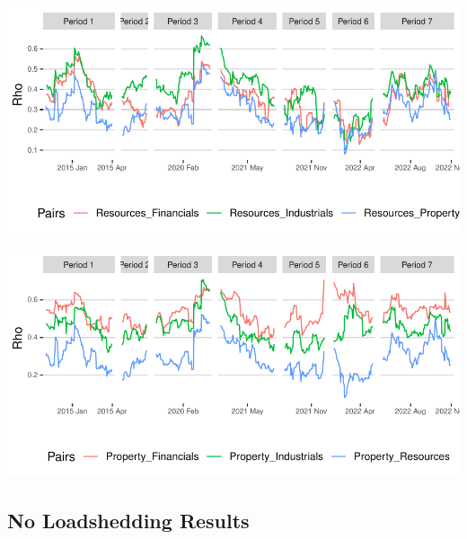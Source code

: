 \documentclass[11pt,preprint, authoryear]{elsarticle}
\let\origfigure\figure
\let\endorigfigure\endfigure
\renewenvironment{figure}[1][2] {
    \expandafter\origfigure\expandafter[H]
} {
    \endorigfigure
}
\numberwithin{equation}{section}
\numberwithin{figure}{section}
\numberwithin{table}{section}
\begin{document}
\begin{figure}[H]

{\centering \includegraphics{Paper_files/figure-latex/DCClsr-1} 

}

\caption{Load-Shedding Dynamic Conditional Correlations: Resources  \label{DCClsr}}\label{fig:DCClsr}
\end{figure}

\begin{figure}[H]

{\centering \includegraphics{Paper_files/figure-latex/DCClsp-1} 

}

\caption{Load-Shedding Dynamic Conditional Correlations: Property  \label{DCClsp}}\label{fig:DCClsp}
\end{figure}

\hypertarget{no-loadshedding-results}{%
\subsection{No Loadshedding Results}\label{no-loadshedding-results}}
\end{document}
